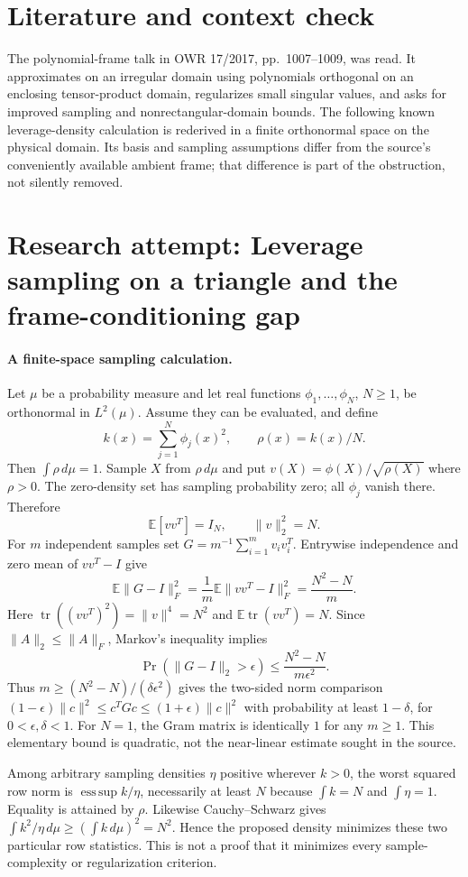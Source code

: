 \documentclass[11pt]{article}
\begin{document}
\section{Literature and context check}
The polynomial-frame talk in OWR 17/2017, pp.~1007--1009, was read. It approximates on an irregular domain using polynomials orthogonal on an enclosing tensor-product domain, regularizes small singular values, and asks for improved sampling and nonrectangular-domain bounds. The following known leverage-density calculation is rederived in a finite orthonormal space on the physical domain. Its basis and sampling assumptions differ from the source's conveniently available ambient frame; that difference is part of the obstruction, not silently removed.
\section{Research attempt: Leverage sampling on a triangle and the frame-conditioning gap}

\paragraph{A finite-space sampling calculation.}
Let $\mu$ be a probability measure and let real functions $\phi_1,\ldots,\phi_N$, $N\ge1$, be orthonormal in $L^2(\mu)$. Assume they can be evaluated, and define
\[
 k(x)=\sum_{j=1}^N\phi_j(x)^2,\qquad \rho(x)=k(x)/N.
\]
Then $\int\rho\,d\mu=1$. Sample $X$ from $\rho\,d\mu$ and put $v(X)=\phi(X)/\sqrt{\rho(X)}$ where $\rho>0$. The zero-density set has sampling probability zero; all $\phi_j$ vanish there. Therefore
\[
 \mathbb E[vv^T]=I_N,\qquad \|v\|_2^2=N.
\]
For $m$ independent samples set $G=m^{-1}\sum_{i=1}^m v_i v_i^T$. Entrywise independence and zero mean of $vv^T-I$ give
\[
 \mathbb E\|G-I\|_F^2
 =\frac1m\mathbb E\|vv^T-I\|_F^2
 =\frac{N^2-N}{m}.
\]
Here $\operatorname{tr}((vv^T)^2)=\|v\|^4=N^2$ and $\mathbb E\operatorname{tr}(vv^T)=N$. Since $\|A\|_2\le\|A\|_F$, Markov's inequality implies
\[
 \Pr(\|G-I\|_2>\epsilon)\le\frac{N^2-N}{m\epsilon^2}.
\]
Thus $m\ge(N^2-N)/(\delta\epsilon^2)$ gives the two-sided norm comparison $(1-\epsilon)\|c\|^2\le c^TGc\le(1+\epsilon)\|c\|^2$ with probability at least $1-\delta$, for $0<\epsilon,\delta<1$. For $N=1$, the Gram matrix is identically $1$ for any $m\ge1$. This elementary bound is quadratic, not the near-linear estimate sought in the source.

Among arbitrary sampling densities $\eta$ positive wherever $k>0$, the worst squared row norm is $\operatorname*{ess\,sup}k/\eta$, necessarily at least $N$ because $\int k=N$ and $\int\eta=1$. Equality is attained by $\rho$. Likewise Cauchy--Schwarz gives $\int k^2/\eta\,d\mu\ge(\int k\,d\mu)^2=N^2$. Hence the proposed density minimizes these two particular row statistics. This is not a proof that it minimizes every sample-complexity or regularization criterion.
\end{document}
